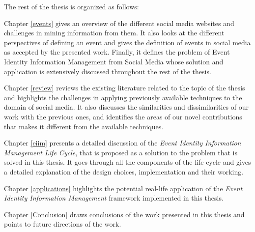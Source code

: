 %
%
%
%

The rest of the thesis is organized as follows:

Chapter \ref{events} gives an overview of the different social media websites and challenges in mining information from them. It also looks at the different perspectives of defining an event and gives the definition of events in social media as accepted by the presented work. Finally, it defines the problem of Event Identity Information Management from Social Media whose solution and application is extensively discussed throughout the rest of the thesis.

Chapter \ref{review} reviews the existing literature related to the topic of the thesis and highlights the challenges in applying previously available techniques to the domain of social media. It also discusses the similarities and dissimilarities of our work with the previous ones, and identifies the areas of our novel contributions that makes it different from the available techniques.

Chapter \ref{eiim} presents a detailed discussion of the \textit{Event Identity Information Management Life Cycle}, that is proposed as a solution to the problem that is solved in this thesis. It goes through all the components of the life cycle and gives a detailed explanation of the design choices, implementation and their working.

Chapter \ref{applications} highlights the potential real-life application of the \textit{Event Identity Information Management} framework implemented in this thesis. 

Chapter \ref{Conclusion} draws conclusions of the work presented in this thesis and points to future directions of the work.
